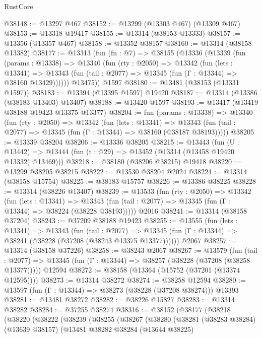 \begin{lexlean}{RustCore}
\begin{coremodule}
@38148 := @13297 @467
@38152 := @13299 (@13303 @467) (@13309 @467)
@38153 := @13318 @19417
@38155 := @13314 (@38153 @13333)
@38157 := @13356 (@13357 @467)
@38158 := @13352 @38157
@38160 := @13314 (@38158 @13382)
@38177 := @13313
    (fun (fn : @7) =>
    @38155
      (@13336
        (@13339
          (fun (params : @13338) =>
          @13340
            (fun (rty : @2050) =>
            @13342
              (fun (lets : @13341) =>
              @13343 (fun (tail : @2077) => @13345 (fun (Γ : @13344) => @38160 @13429))))))
        @13475))
    @1597
@38180 := @13481 (@38153 (@13331 @1597))
@38183 := @13394 (@13395 @1597) @19420
@38187 := @13314 (@13386 (@38183 @13403) @13407)
@38188 := @13420 @1597
@38193 := @13417 (@13419 @38188 @19423 @13375 @13377)
@38204 := fun (params : @13338) =>
  @13340
    (fun (rty : @2050) =>
    @13342
      (fun (lets : @13341) =>
      @13343 (fun (tail : @2077) => @13345 (fun (Γ : @13344) => @38160 (@38187 @38193)))))
@38205 := @13339 @38204
@38206 := @13336 @38205
@38215 := @13443
    (fun (U : @13442) => @13444 (fun (t : @29) => @13452 (@13314 (@13458 @19420 @13332) @13469)))
@38218 := @38180 (@38206 @38215) @19418
@38220 := @13299 @38205 @38215
@38222 := @13530 @38204 @2024
@38224 := @13314 (@38158 @15754)
@38225 := @38183 @15757
@38226 := @13386 @38225
@38228 := @13314 (@38226 @13407)
@38239 := @13533
    (fun (rty : @2050) =>
    @13342
      (fun (lets : @13341) =>
      @13343 (fun (tail : @2077) => @13345 (fun (Γ : @13344) => @38224 (@38228 @38193)))))
    @2016
@38241 := @13314 (@38158 @37204)
@38243 := @37209 @38188 @19423
@38255 := @13555
    (fun (lets : @13341) =>
    @13343
      (fun (tail : @2077) =>
      @13345 (fun (Γ : @13344) => @38241 (@38228 (@37208 (@38243 @13375 @13377))))))
    @2067
@38257 := @13314 (@38158 @37226)
@38258 := @38243 @2067
@38267 := @13579
    (fun (tail : @2077) => @13345 (fun (Γ : @13344) => @38257 (@38228 (@37208 (@38258 @13377)))))
    @12594
@38272 := @38158 (@13364 (@15752 (@37201 (@13374 @12595))))
@38273 := @13314 @38272
@38274 := @38258 @12594
@38280 := @13597 (fun (Γ : @13344) => @38273 (@38228 (@37208 @38274))) @13393
@38281 := @13481 @38272
@38282 := @38226 @15827
@38283 := @13314 @38282
@38284 := @37255 @38274
@38316 := @38152
    (@38177
      (@38218
        (@38220
          (@38222
            (@38239
              (@38255
                (@38267
                  (@38280
                    (@38281
                      (@38283 @38284)
                      (@13639 @38157)
                      (@13481
                        @38282
                        @38284
                        (@13644 @38225)

\end{coremodule}
\end{lexlean}
